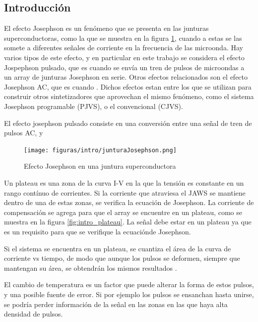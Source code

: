 \documentclass[twoside]{article}
\begin{document}
\begin{multicols}{2}

\section{Introducción}

El efecto Josephson es un fenómeno que se presenta en las junturas superconductoras, como la que se muestra en la figura \ref{fig:intro_junturaJosephson}, cuando a estas se las somete a diferentes señales de corriente en la frecuencia de las microonda. Hay varios tipos de este efecto, y en particular en este trabajo se considera el efecto Jospephson pulsado, que es cuando se envía un tren de pulsos de microondas a un array de junturas Josephson en serie. Otros efectos relacionados son el efecto Josephson AC, que es cuando . Dichos efectos estan entre los que se utilizan para construir otros sintetizadores que aprovechan el mismo fenómeno, como el sistema Josephson programable (PJVS), o el convencional (CJVS). 

El efecto josephson pulsado consiste en una conversión entre una señal de tren de pulsos AC,  y 



\begin{figure}[H]
    \centering
    \texttt{[image: figuras/intro/junturaJosephson.png]}
    \caption{Efecto Josephson en una juntura superconductora}
    \label{fig:intro_junturaJosephson}
\end{figure}



Un plateau es una zona de la curva I-V en la que la tensión es constante en un rango contínuo de corrientes. Si la corriente que atraviesa el JAWS se mantiene dentro de una de estas zonas, se verifica la ecuación de Josephson.
La corriente de compensación se agrega para que el array se encuentre en un plateau, como se muestra en la figura \ref{fig:intro_plateau}. La señal debe estar en un plateau ya que es un requisito para que se verifique la ecuaciónde Josephson.

Si el sistema se encuentra en un plateau, se cuantiza el área de la curva de corriente vs tiempo, de modo que aunque los pulsos se deformen, siempre que mantengan su área, se obtendrán los mismos resultados \cite{benz1998}.

El cambio de temperatura es un factor que puede alterar la forma de estos pulsos, y una posible fuente de error. Si por ejemplo los pulsos se ensanchan hasta unirse, se podría perder información de la señal en las zonas en las que haya alta densidad de pulsos.


\end{multicols}
\end{document}
